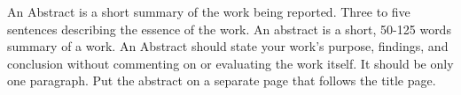 An Abstract is a short summary of the work being reported. Three to five sentences describing the essence of the work. An abstract is a short, 50-125 words summary of a work. An Abstract should state your work's purpose, findings, and conclusion without commenting on or evaluating the work itself.  It should be only one paragraph. Put the abstract on a separate page that follows the title page.
